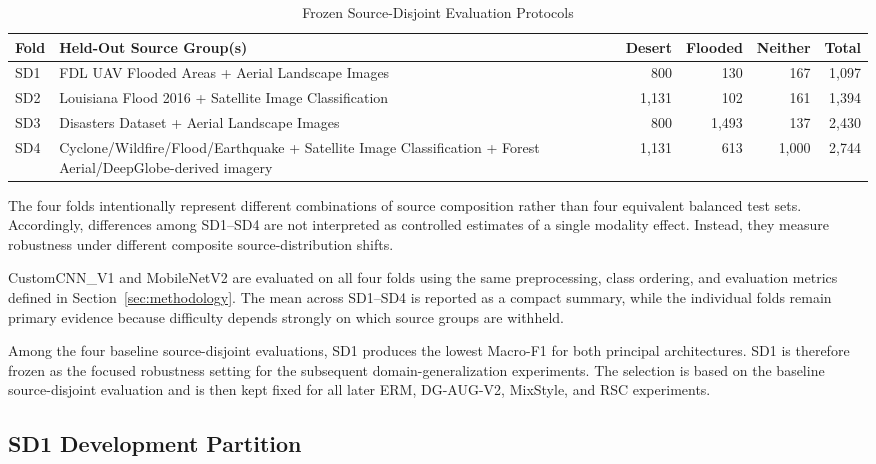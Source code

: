 \begin{table}[t]
\centering
\caption{Frozen Source-Disjoint Evaluation Protocols}
\label{tab:source_disjoint_protocol}
\small
\begin{tabular}{p{} p{} rrrr}
\hline
\textbf{Fold} &
\textbf{Held-Out Source Group(s)} &
\textbf{Desert} &
\textbf{Flooded} &
\textbf{Neither} &
\textbf{Total} \\
\hline

SD1 &
FDL UAV Flooded Areas + Aerial Landscape Images &
800 & 130 & 167 & 1,097 \\

SD2 &
Louisiana Flood 2016 + Satellite Image Classification &
1,131 & 102 & 161 & 1,394 \\

SD3 &
Disasters Dataset + Aerial Landscape Images &
800 & 1,493 & 137 & 2,430 \\

SD4 &
Cyclone/Wildfire/Flood/Earthquake +
Satellite Image Classification +
Forest Aerial/DeepGlobe-derived imagery &
1,131 & 613 & 1,000 & 2,744 \\

\hline
\end{tabular}
\end{table}

The four folds intentionally represent different combinations of
source composition rather than four equivalent balanced test sets.
Accordingly, differences among SD1--SD4 are not interpreted as
controlled estimates of a single modality effect. Instead, they
measure robustness under different composite source-distribution
shifts.

CustomCNN\_V1 and MobileNetV2 are evaluated on all four folds using
the same preprocessing, class ordering, and evaluation metrics
defined in Section~\ref{sec:methodology}. The mean across SD1--SD4
is reported as a compact summary, while the individual folds remain
primary evidence because difficulty depends strongly on which source
groups are withheld.

Among the four baseline source-disjoint evaluations, SD1 produces
the lowest Macro-F1 for both principal architectures. SD1 is therefore
frozen as the focused robustness setting for the subsequent
domain-generalization experiments. The selection is based on the
baseline source-disjoint evaluation and is then kept fixed for all
later ERM, DG-AUG-V2, MixStyle, and RSC experiments.

\subsection{SD1 Development Partition}

